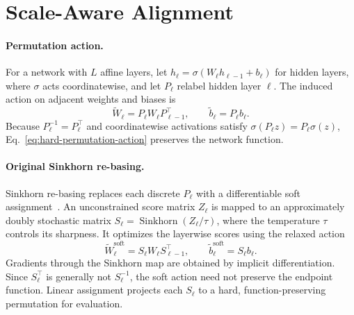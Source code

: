 \documentclass[twoside]{article}
\begin{document}
\section{Scale-Aware Alignment}
\label{sec:method}

\paragraph{Permutation action.}
For a network with $L$ affine layers, let
$h_\ell=\sigma(W_\ell h_{\ell-1}+b_\ell)$ for hidden layers, where $\sigma$
acts coordinatewise, and let $P_\ell$ relabel hidden layer $\ell$.  The induced
action on adjacent weights and biases is
\begin{equation}
\widetilde W_\ell=P_\ell W_\ell P_{\ell-1}^{\top},\qquad
\widetilde b_\ell=P_\ell b_\ell.
\label{eq:hard-permutation-action}
\end{equation}
Because $P_\ell^{-1}=P_\ell^\top$ and coordinatewise activations satisfy
$\sigma(P_\ell z)=P_\ell\sigma(z)$,
Eq.~\ref{eq:hard-permutation-action} preserves the network function.

\paragraph{Original Sinkhorn re-basing.}

Sinkhorn re-basing replaces each discrete $P_\ell$ with a differentiable soft
assignment~\citep{guerrero2023rebasin}.  An unconstrained score matrix $Z_\ell$
is mapped to an approximately doubly stochastic matrix
$S_\ell=\operatorname{Sinkhorn}(Z_\ell/\tau)$, where the temperature $\tau$
controls its sharpness.  It optimizes the layerwise scores using the relaxed
action
\begin{equation}
\widetilde W_\ell^{\mathrm{soft}}
=S_\ell W_\ell S_{\ell-1}^{\top},\qquad
\widetilde b_\ell^{\mathrm{soft}}=S_\ell b_\ell.
\label{eq:soft-permutation-action}
\end{equation}
Gradients through the Sinkhorn map are obtained by implicit
differentiation.  Since $S_\ell^\top$ is generally not $S_\ell^{-1}$, the soft
action need not preserve the endpoint function.  Linear assignment projects
each $S_\ell$ to a hard, function-preserving permutation for evaluation.
\end{document}
